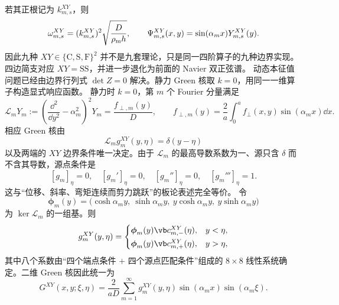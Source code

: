 若其正根记为 \(k_{m,s}^{XY}\)，则
\[
 \omega_{m,s}^{XY}
 =(k_{m,s}^{XY})^2\sqrt{\frac{D}{\rho_{\rm m} h}},
 \qquad
 \Psi_{m,s}^{XY}(x,y)
 =\sin(\alpha_m x)Y_{m,s}^{XY}(y).
\]
因此九种 \(XY\in\{\mathrm C,\mathrm S,\mathrm F\}^2\) 并不是九套理论，只是同一四阶算子的九种边界实现。四边简支对应 \(XY=\mathrm{SS}\)，并进一步退化为前面的 Navier 双正弦谱。
动态本征值问题已经由边界行列式 $\det Z=0$ 解决。静力 Green 核取 $k=0$，用同一一维算子构造显式响应函数。
静力时 \(k=0\)，第 \(m\) 个 Fourier 分量满足
\begin{equation}
 \mathscr L_mY_m
 :=\left(\frac{\dd^2}{\dd y^2}-\alpha_m^2\right)^2Y_m
 =\frac{f_{\perp,m}(y)}{D},
 \qquad
 f_{\perp,m}(y)=\frac{2}{a}\int_0^a f_\perp(x,y)\sin(\alpha_mx)\dd x.
 \label{eq:phys-sm-levy-static-ode}
\end{equation}
相应 Green 核由
\begin{equation}
 \mathscr L_m g_m^{XY}(y,\eta)=\delta(y-\eta)
 \label{eq:phys-sm-levy-green-ode}
\end{equation}
以及两端的 \(XY\) 边界条件唯一决定。由于 \(\mathscr L_m\) 的最高导数系数为一、源只含 \(\delta\) 而不含其导数，源点条件是
\[
[g_m]_{\eta}=0,
\quad[g_m']_{\eta}=0,
\quad[g_m'']_{\eta}=0,
\quad[g_m''']_{\eta}=1.
\]
这与“位移、斜率、弯矩连续而剪力跳跃”的板论表述完全等价。
令
\[
 \boldsymbol\phi_m(y)
 =\bigl(\cosh\alpha_my,\ \sinh\alpha_my,\ y\cosh\alpha_my,\ y\sinh\alpha_my\bigr)
\]
为 \(\ker\mathscr L_m\) 的一组基。则
\[
 g_m^{XY}(y,\eta)=
 \begin{cases}
 \boldsymbol\phi_m(y)\vb c_{m,-}^{XY}(\eta),&y<\eta,\\[2pt]
 \boldsymbol\phi_m(y)\vb c_{m,+}^{XY}(\eta),&y>\eta,
 \end{cases}
\]
其中八个系数由“四个端点条件 + 四个源点匹配条件”组成的 \(8\times8\) 线性系统确定。二维 Green 核因此统一为
\begin{equation}
 G^{XY}(x,y;\xi,\eta)
 =\frac{2}{aD}\sum_{m=1}^{\infty}
 g_m^{XY}(y,\eta)
 \sin(\alpha_mx)\sin(\alpha_m\xi).
 \label{eq:phys-sm-levy-2d-green}
\end{equation}
